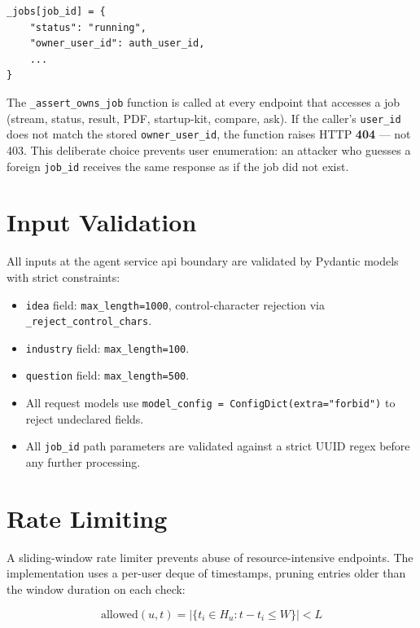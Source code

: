 \documentclass[12pt,a4paper,oneside]{book}
\begin{document}
\begin{lstlisting}[caption={Job ownership stored at creation time}]
_jobs[job_id] = {
    "status": "running",
    "owner_user_id": auth_user_id,
    ...
}
\end{lstlisting}

The \texttt{\_assert\_owns\_job} function is called at every endpoint that accesses a job (stream, status, result, PDF, startup-kit, compare, ask). If the caller's \texttt{user\_id} does not match the stored \texttt{owner\_user\_id}, the function raises HTTP \textbf{404} — not 403. This deliberate choice prevents user enumeration: an attacker who guesses a foreign \texttt{job\_id} receives the same response as if the job did not exist.

\section{Input Validation}

All inputs at the agent service \gls{api} boundary are validated by Pydantic models with strict constraints:

\begin{itemize}
  \item \texttt{idea} field: \texttt{max\_length=1000}, control-character rejection via \texttt{\_reject\_control\_chars}.
  \item \texttt{industry} field: \texttt{max\_length=100}.
  \item \texttt{question} field: \texttt{max\_length=500}.
  \item All request models use \texttt{model\_config = ConfigDict(extra="forbid")} to reject undeclared fields.
  \item All \texttt{job\_id} path parameters are validated against a strict UUID regex before any further processing.
\end{itemize}

\section{Rate Limiting}

A sliding-window rate limiter prevents abuse of resource-intensive endpoints. The implementation uses a per-user deque of timestamps, pruning entries older than the window duration on each check:

\begin{equation}
  \text{allowed}(u, t) = \left|\{ t_i \in H_u : t - t_i \leq W \}\right| < L
\end{equation}
\end{document}
